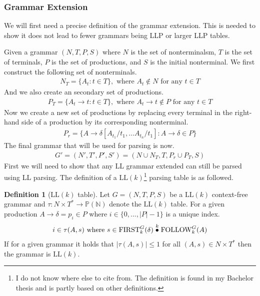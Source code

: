 \documentclass[a4paper,12pt]{article}
\newcommand{\truncprod}[1]{\stackrel{\mathclap{#1}}{\bullet}}
\newcommand\LL{\text{LL}}
\newcommand\FIRST{\text{FIRST}}
\newcommand\FOLLOW{\text{FOLLOW}}
\theoremstyle{definition}
\newtheorem{definition}{Definition}[section]
\begin{document}
\subsubsection{Grammar Extension}
We will first need a precise definition of the grammar extension. This is needed to show it does not lead to fewer grammars being LLP or larger LLP tables. 

Given a grammar $(N, T, P, S)$ where $N$ is the set of nonterminalsm, $T$ is the set of terminals, $P$ is the set of productions, and $S$ is the initial nonterminal. We first construct the following set of nonterminals.
\begin{align*}
  N_{T} = \{A_t : t \in T\}, \text{ where } A_t \notin N \text{ for any } t \in T
\end{align*}
And we also create an secondary set of productions.
\begin{align*}
  P_{T} = \{A_t \to t : t \in T\}, \text{ where } A_t \to t \notin P \text{ for any } t \in T
\end{align*}
Now we create a new set of productions by replacing every terminal in the right-hand side of a production by its corresponding nonterminal.
\begin{align*}
  P_r = \{A \to \delta[A_{t_1}/t_1, \dots A_{t_n}/t_1] : A \to \delta \in P\}
\end{align*}
The final grammar that will be used for parsing is now.
\begin{align*}
  G' = (N', T', P', S') = (N \cup N_T, T, P_r \cup P_T, S)
\end{align*}
First we will need to show that any LL grammar extended can still be parsed using LL parsing. The definition of a $\LL(k)$\footnote{I do not know where else to cite from. The definition is found in my Bachelor thesis and is partly based on other definitions.} \cite{due2023} parsing table is as followed.
\begin{definition}[$\LL(k)$ table]
  Let $G = (N, T, P, S)$ be a $\LL(k)$ context-free grammar and $\tau : N \times T^* \to \mathbb{P}(\mathbb{N})$ denote the $\LL(k)$ table. For a given production $A \to \delta = p_i \in P$ where $i \in \{0, ..., |P| - 1\}$ is a unique index.
  \begin{gather*}
      i \in \tau(A, s) \text{ where } s \in \FIRST^G_k(\delta) \truncprod{k} \FOLLOW^G_k(A)
  \end{gather*}
  If for a given grammar it holds that $|\tau(A, s)| \leq 1$ for all $(A, s) \in N \times T^*$ then the grammar is $\LL(k)$.
\end{definition}
\end{document}
